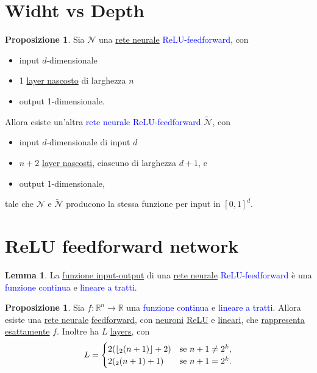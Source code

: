 \documentclass[10pt]{book}
\newcommand{\1}{\mathds{1}}
\newcommand{\R}{\mathds{R}}
\renewcommand{\tilde}[1]{\widetilde{#1}}
\newcommand{\floor}[1]{\left\lfloor #1 \right\rfloor}
\let\log\relax
\DeclareMathOperator{\log}{log}
\theoremstyle{definition}%
\newtheorem{lem}[thm]{Lemma}
\newtheorem{prop}[thm]{Proposizione}
\theoremstyle{plain}
\theoremstyle{remark}
\renewcommand{\href}[2]{\textcolor{blue}{#2}}
\begin{document}
\section{Widht vs Depth}
\label{sec:org7354524}

\begin{prop}
Sia \(\mathcal{N}\) una \hyperref[sec:org1346ff2]{rete neurale} \href{../../../../../org/roam/20250624155858-neurone_artificiale.org}{ReLU-feedforward}, con
\begin{itemize}
\item input \(d\)-dimensionale
\item 1 \hyperref[sec:org239d5ff]{layer nascosto} di larghezza \(n\)
\item output 1-dimensionale.
\end{itemize}

Allora esiste un'altra \href{../../../../../org/roam/20250624155858-neurone_artificiale.org}{rete neurale ReLU-feedforward} \(\tilde{\mathcal{N}}\), con
\begin{itemize}
\item input \(d\)-dimensionale di input \(d\)
\item \(n+2\) \hyperref[sec:org239d5ff]{layer nascosti}, ciascuno di larghezza \(d+1\), e
\item output 1-dimensionale,
\end{itemize}
tale che \(\mathcal{N}\) e \(\tilde{\mathcal{N}}\) producono la stessa funzione per input in \([0,1]^{d}\).
\label{prop10.2.5}
\end{prop}
\section{ReLU feedforward network}
\label{sec:org114aea1}

\begin{lem}
La \hyperref[sec:org1346ff2]{funzione input-output} di una \hyperref[sec:org1346ff2]{rete neurale} \href{../../../../../org/roam/20250624155858-neurone_artificiale.org}{ReLU-feedforward} è una \href{../../../../../org/roam/20250103103252-funzione_continua.org}{funzione continua} e \href{../../../../../org/roam/20250701140551-funzione_lineare_a_tratti.org}{lineare a tratti}.
\label{lem10.2.6}
\end{lem}
\begin{prop}
Sia \(f:\R^{n}\to \R\) una \href{../../../../../org/roam/20250103103252-funzione_continua.org}{funzione continua} e \href{../../../../../org/roam/20250701140551-funzione_lineare_a_tratti.org}{lineare a tratti}. Allora esiste una \hyperref[sec:org1346ff2]{rete neurale} \hyperref[sec:org9afed3b]{feedforward}, con \hyperref[sec:org0026bd1]{neuroni} \hyperref[sec:orgbc4b1b1]{ReLU} e \hyperref[sec:org0042486]{lineari}, che \hyperref[sec:org3a813f6]{rappresenta esattamente} \(f\). Inoltre ha \(L\) \hyperref[sec:org239d5ff]{layers}, con
\begin{equation*}
L=\begin{cases}
2(\floor{\log_{2}(n+1)}+2) &\text{se }n+1\neq 2^{k},\\
2(\log_{2}(n+1)+1) &\text{se }n+1=2^{k}.
\end{cases}
\end{equation*}
\label{prop10.2.7}
\end{prop}
\end{document}
